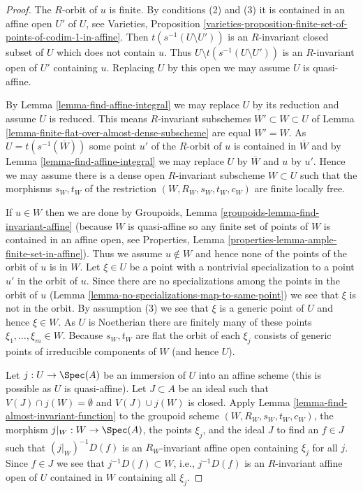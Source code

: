 \begin{proof}
The $R$-orbit of $u$ is finite. By conditions (2) and (3) it is contained
in an affine open $U'$ of $U$, see
Varieties, Proposition
\ref{varieties-proposition-finite-set-of-points-of-codim-1-in-affine}.
Then $t(s^{-1}(U \setminus U'))$ is an $R$-invariant
closed subset of $U$ which does not contain $u$. Thus
$U \setminus t(s^{-1}(U \setminus U'))$ is an $R$-invariant open
of $U'$ containing $u$.
Replacing $U$ by this open we may assume $U$ is quasi-affine.

\medskip\noindent
By Lemma \ref{lemma-find-affine-integral} we may replace $U$ by its reduction
and assume $U$ is reduced. This means $R$-invariant subschemes
$W' \subset W \subset U$ of
Lemma \ref{lemma-finite-flat-over-almost-dense-subscheme}
are equal $W' = W$. As $U = t(s^{-1}(\overline{W}))$ some point
$u'$ of the $R$-orbit of $u$ is contained in $\overline{W}$
and by Lemma \ref{lemma-find-affine-integral}
we may replace $U$ by $\overline{W}$ and $u$ by $u'$.
Hence we may assume there is
a dense open $R$-invariant subscheme $W \subset U$ such that
the morphisms $s_W, t_W$ of the restriction $(W, R_W, s_W, t_W, c_W)$ are
finite locally free.

\medskip\noindent
If $u \in W$ then we are done by
Groupoids, Lemma \ref{groupoids-lemma-find-invariant-affine}
(because $W$ is quasi-affine so any finite set of points
of $W$ is contained in an affine open, see
Properties, Lemma \ref{properties-lemma-ample-finite-set-in-affine}).
Thus we assume $u \not \in W$ and hence none of the points of the
orbit of $u$ is in $W$. Let $\xi \in U$
be a point with a nontrivial specialization to a point $u'$ in the orbit
of $u$. Since there are no specializations among the points in the
orbit of $u$ (Lemma \ref{lemma-no-specializations-map-to-same-point})
we see that $\xi$ is not in the orbit.
By assumption (3) we see that $\xi$ is a generic point of $U$
and hence $\xi \in W$.
As $U$ is Noetherian there are finitely many of these
points $\xi_1, \ldots, \xi_m \in W$. Because $s_W, t_W$ are flat the orbit
of each $\xi_j$ consists of generic points of irreducible components
of $W$ (and hence $U$).

\medskip\noindent
Let $j : U \to \Spec(A)$ be an immersion of $U$ into an affine scheme
(this is possible as $U$ is quasi-affine). Let $J \subset A$
be an ideal such that $V(J) \cap j(W) = \emptyset$ and $V(J) \cup j(W)$
is closed. Apply Lemma \ref{lemma-find-almost-invariant-function}
to the groupoid scheme $(W, R_W, s_W, t_W, c_W)$, the morphism
$j|_W : W \to \Spec(A)$, the points $\xi_j$, and the ideal $J$
to find an $f \in J$ such that $(j|_W)^{-1}D(f)$ is an $R_W$-invariant
affine open containing $\xi_j$ for all $j$. Since $f \in J$
we see that $j^{-1}D(f) \subset W$, i.e., $j^{-1}D(f)$ is
an $R$-invariant affine open of $U$ contained in $W$
containing all $\xi_j$.


\end{proof}
